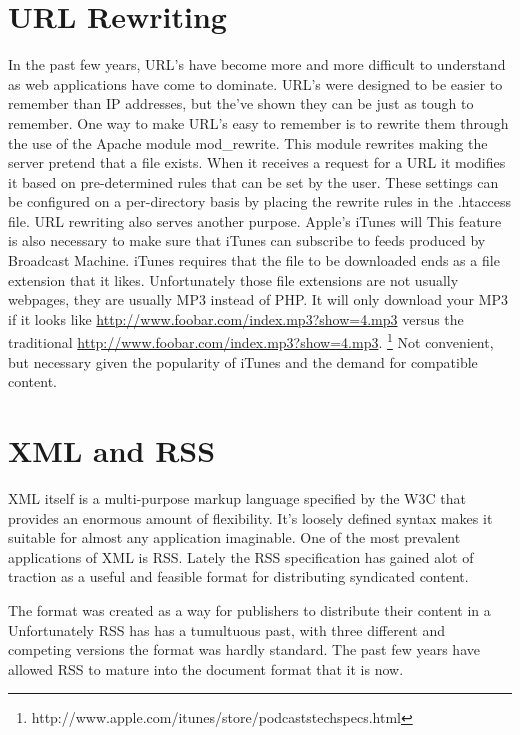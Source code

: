 \documentclass[a4paper,12pt]{report}
\begin{document}
\section{URL Rewriting}
In the past few years, URL's have become more and more difficult to understand as web applications have come to dominate.
URL's were designed to be easier to remember than IP addresses, but the've shown they can be just as tough to remember.
One way to make URL's easy to remember is to rewrite them through the use of the Apache module mod\_rewrite.
This module rewrites making the server pretend that a file exists.
When it receives a request for a URL it modifies it based on pre-determined rules that can be set by the user.
These settings can be configured on a per-directory basis by placing the rewrite rules in the .htaccess file.
URL rewriting also serves another purpose.
Apple's iTunes will 
This feature is also necessary to make sure that iTunes can subscribe to feeds produced by Broadcast Machine.
iTunes requires that the file to be downloaded ends as a file extension that it likes.
Unfortunately those file extensions are not usually webpages, they are usually MP3 instead of PHP.
It will only download your MP3 if it looks like \url{http://www.foobar.com/index.mp3?show=4.mp3} versus the traditional \url{http://www.foobar.com/index.mp3?show=4.mp3}. \footnote{http://www.apple.com/itunes/store/podcaststechspecs.html}
Not convenient, but necessary given the popularity of iTunes and the demand for compatible content.


\section{XML and RSS}
XML itself is a multi-purpose markup language specified by the W3C that provides an enormous amount of flexibility.
It's loosely defined syntax makes it suitable for almost any application imaginable.
One of the most prevalent applications of XML is RSS.
Lately the RSS specification has gained alot of traction as a useful and feasible format for distributing syndicated content.

The format was created as a way for publishers to distribute their content in a 
Unfortunately RSS has has a tumultuous past, with three different and competing versions the format was hardly standard.
The past few years have allowed RSS to mature into the document format that it is now.
\end{document}
